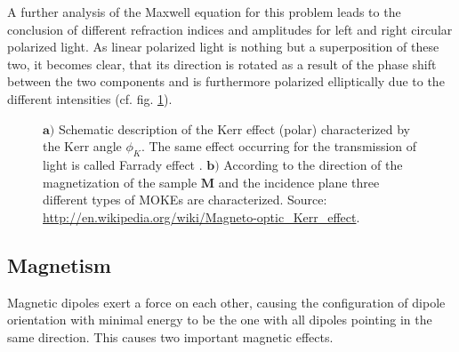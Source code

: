 \documentclass[a4paper]{scrartcl}
\numberwithin{equation}{section}
\numberwithin{figure}{section}
\numberwithin{table}{section}
\newcommand{\ve}[1]{\mathbf{ #1} }
\begin{document}
A further analysis of the Maxwell equation for this problem \cite{dissert} leads to the conclusion of different refraction indices and amplitudes for left and right circular polarized light. As linear polarized light is nothing but a superposition of these two, it becomes clear, that its direction is rotated as a result of the phase shift between the two components and is furthermore polarized elliptically due to the different intensities (cf. fig. \ref{fig:kerr}).



\begin{figure} 
 \centering
{}
{}

\caption{
\small $\ve a)$ Schematic description of the Kerr effect (polar) characterized by the Kerr angle $\phi_K$. The same effect occurring for the transmission of light is called Farrady effect \cite{dissert}. $\ve b)$ According to the direction of the magnetization of the sample $\ve M$ and the incidence plane three different types of MOKEs are characterized. 
Source: \url{http://en.wikipedia.org/wiki/Magneto-optic_Kerr_effect}. } 
	\label{fig:kerr}
\end{figure}




\subsection{Magnetism}
Magnetic dipoles exert a force on each other, causing the configuration of dipole orientation with minimal energy to be the one with all dipoles pointing in the same direction. This causes two important magnetic effects.
\end{document}
